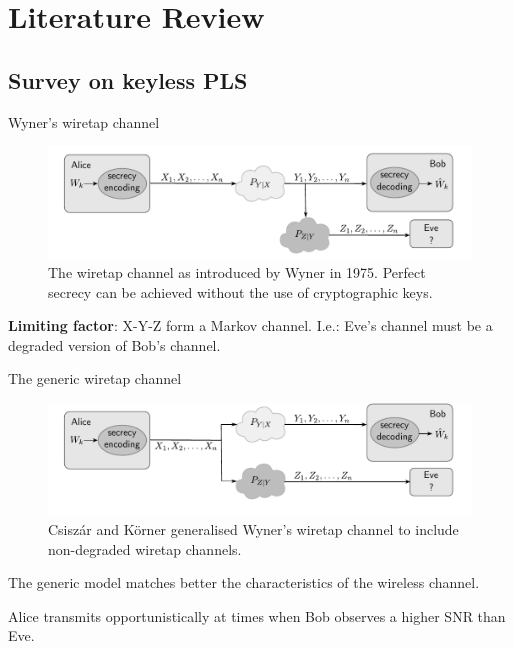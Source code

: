 
\section{Literature Review}
\subsection{Survey on keyless PLS}
\begin{frame}{Wyner's wiretap channel}
\begin{figure}
    \centering
    \includegraphics[scale = 0.6]{slides/figures/WiretapChannelWyner.pdf}
    \caption{The wiretap channel as introduced by Wyner in 1975. Perfect secrecy can be achieved without the use of cryptographic keys. }
    \label{fig:wyner}
\end{figure}

\textbf{Limiting factor}: X-Y-Z form a Markov channel. I.e.: Eve's channel must be a degraded version of Bob's channel.
\end{frame}


\begin{frame}{The generic wiretap channel}
\begin{figure}
    \centering
    \includegraphics[scale = 0.5]{slides/figures/WiretapChannelCK.pdf}
    \caption{Csisz\'ar and K\"orner generalised Wyner's wiretap channel to include non-degraded wiretap channels.}
    \label{fig:CK}
\end{figure}


 The generic model matches better the characteristics of the wireless channel.

Alice transmits opportunistically at times when Bob observes a higher SNR than Eve.
\end{frame}

